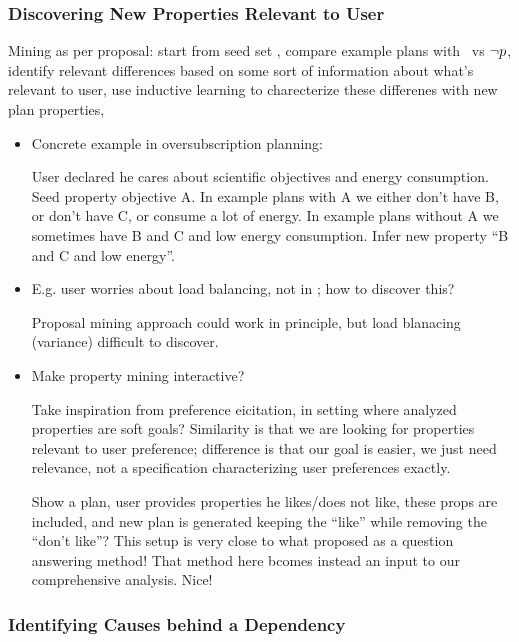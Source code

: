 \subsubsection{Discovering New Properties Relevant to User}

Mining as per proposal: start from seed set \props, compare example
plans with \prop\ vs $\neg p$, identify relevant differences based
on some sort of information about what's relevant to user, use
inductive learning to charecterize these differenes with new plan
properties,

\begin{itemize}
\item Concrete example in oversubscription planning:

  User declared he cares about scientific objectives and energy
  consumption. Seed property objective A. In example plans with A we
  either don't have B, or don't have C, or consume a lot of energy. In
  example plans without A we sometimes have B and C and low energy
  consumption. Infer new property ``B and C and low energy''.

\item E.g. user worries about load balancing, not in \props; how to
  discover this?

  Proposal mining approach could work in principle, but load blanacing
  (variance) difficult to discover.

\item Make property mining interactive?

  Take inspiration from preference eicitation, in setting where
  analyzed properties are soft goals? Similarity is that we are
  looking for properties relevant to user preference; difference is
  that our goal is easier, we just need relevance, not a specification
  characterizing user preferences exactly.

   Show a plan, user provides
  properties he likes/does not like, these props are included, and new
  plan is generated keeping the ``like'' while removing the ``don't
  like''?  This setup is very close to what
  \cite{fox:etal:ijcai-ws-17} proposed as a question answering method!
  That method here bcomes instead an input to our comprehensive
  analysis. Nice!

\end{itemize}




\subsubsection{Identifying Causes behind a Dependency}

